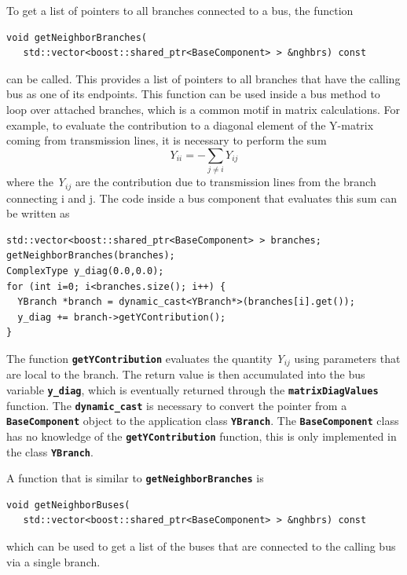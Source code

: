 To get a list of pointers to all branches connected to a bus, the function

{
\color{red}
\begin{Verbatim}[fontseries=b]
void getNeighborBranches(
   std::vector<boost::shared_ptr<BaseComponent> > &nghbrs) const
\end{Verbatim}
}

can be called. This provides a list of pointers to all branches that have the calling bus as one of its endpoints. This function can be used inside a bus method to loop over attached branches, which is a common motif in matrix calculations. For example, to evaluate the contribution to a diagonal element of the Y-matrix coming from transmission lines, it is necessary to perform the sum\[Y_{ii}=-\sum_{j\neq i}{Y_{ij}}\] 
where the \textit{Y${}_{ij}$ }are the contribution due to transmission lines from the branch connecting i and j. The code inside a bus component that evaluates this sum can be written as

{
\color{red}
\begin{Verbatim}[fontseries=b]
std::vector<boost::shared_ptr<BaseComponent> > branches;
getNeighborBranches(branches);
ComplexType y_diag(0.0,0.0);
for (int i=0; i<branches.size(); i++) {
  YBranch *branch = dynamic_cast<YBranch*>(branches[i].get());
  y_diag += branch->getYContribution();
}
\end{Verbatim}
}

The function \texttt{\textbf{getYContribution}} evaluates the quantity \textit{Y${}_{ij}$ }using parameters that are local to the branch. The return value is then accumulated into the bus variable \texttt{\textbf{y\_diag}}, which is eventually returned through the \texttt{\textbf{matrixDiagValues}} function. The \texttt{\textbf{dynamic\_cast}} is necessary to convert the pointer from a \texttt{\textbf{BaseComponent}} object to the application class \texttt{\textbf{YBranch}}. The \texttt{\textbf{BaseComponent}} class has no knowledge of the \texttt{\textbf{getYContribution}} function, this is only implemented in the class \texttt{\textbf{YBranch}}.

A function that is similar to \texttt{\textbf{getNeighborBranches}} is

{
\color{red}
\begin{Verbatim}[fontseries=b]
void getNeighborBuses(
   std::vector<boost::shared_ptr<BaseComponent> > &nghbrs) const
\end{Verbatim}
}

which can be used to get a list of the buses that are connected to the calling bus via a single branch.

